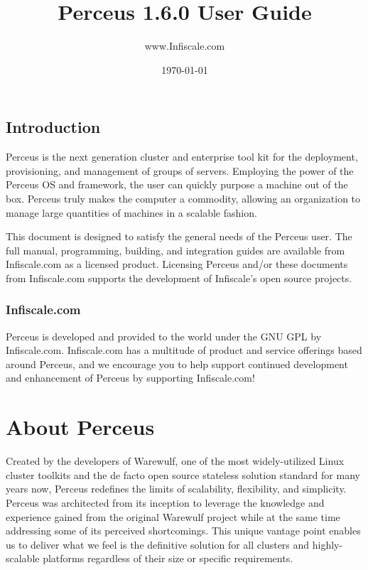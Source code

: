 \documentclass[10pt,letterpaper]{report}
\begin{document}
\title{Perceus 1.6.0 User Guide}

\author{www.Infiscale.com}

\date{\today}

\maketitle

\addtolength{\parskip}{0.5\baselineskip}

\section{Introduction}
Perceus is the next generation cluster and enterprise tool kit for the
deployment, provisioning, and management of groups of servers. Employing the
power of the Perceus OS and framework, the user can quickly purpose a machine
out of the box. Perceus truly makes the computer a commodity, allowing an
organization to manage large quantities of machines in a scalable fashion.

This document is designed to satisfy the general needs of the Perceus user.
The full manual, programming, building, and integration guides are available
from Infiscale.com as a licensed product. Licensing Perceus and/or these
documents from Infiscale.com supports the development of Infiscale's open
source projects.

\subsection{Infiscale.com}
Perceus is developed and provided to the world under the GNU GPL by
Infiscale.com. Infiscale.com has a multitude of product and service offerings
based around Perceus, and we encourage you to help support continued
development and enhancement of Perceus by supporting Infiscale.com!

\newpage
\tableofcontents
\newpage

\chapter{About Perceus}
Created by the developers of Warewulf, one of the most widely-utilized Linux
cluster toolkits and the de facto open source stateless solution standard for
many years now, Perceus redefines the limits of scalability, flexibility, and
simplicity.  Perceus was architected from its inception to leverage the
knowledge and experience gained from the original Warewulf project while at the
same time addressing some of its perceived shortcomings.  This unique vantage
point enables us to deliver what we feel is the definitive solution for all
clusters and highly-scalable platforms regardless of their size or specific
requirements.
\end{document}
